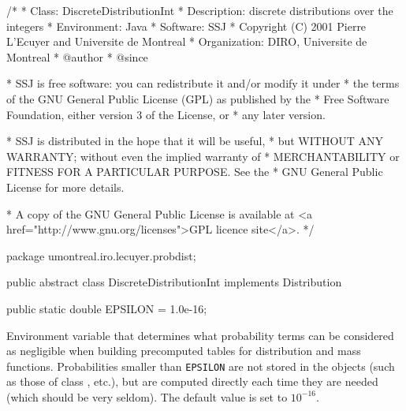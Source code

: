 \begin{code}
\begin{hide}
/*
 * Class:        DiscreteDistributionInt
 * Description:  discrete distributions over the integers
 * Environment:  Java
 * Software:     SSJ 
 * Copyright (C) 2001  Pierre L'Ecuyer and Universite de Montreal
 * Organization: DIRO, Universite de Montreal
 * @author       
 * @since

 * SSJ is free software: you can redistribute it and/or modify it under
 * the terms of the GNU General Public License (GPL) as published by the
 * Free Software Foundation, either version 3 of the License, or
 * any later version.

 * SSJ is distributed in the hope that it will be useful,
 * but WITHOUT ANY WARRANTY; without even the implied warranty of
 * MERCHANTABILITY or FITNESS FOR A PARTICULAR PURPOSE.  See the
 * GNU General Public License for more details.

 * A copy of the GNU General Public License is available at
   <a href="http://www.gnu.org/licenses">GPL licence site</a>.
 */
\end{hide}
package umontreal.iro.lecuyer.probdist;

public abstract class DiscreteDistributionInt implements Distribution\begin{hide} {\end{hide}

   public static double EPSILON = 1.0e-16;\end{code}
 \begin{tabb} Environment variable that determines what probability terms can
  be considered as negligible when building precomputed tables for
  distribution and mass functions.  Probabilities smaller than \texttt{EPSILON}
  are not stored in the
   objects
  (such as those of class , etc.), but are computed
  directly each time they are needed (which should be very seldom).
  The default value is set to $10^{-16}$.
 \end{tabb}
